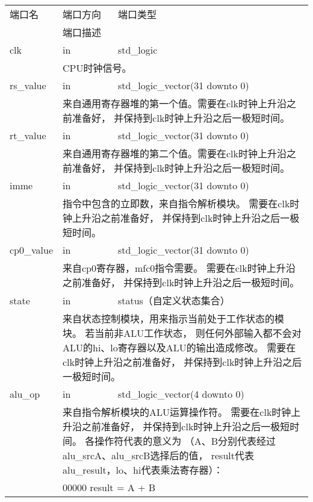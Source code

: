         \begin{tabularx}{\textwidth}{lll}
            \toprule
            端口名          & 端口方向 & 端口类型 \\
            \cmidrule(l){2-3}
                            & \multicolumn{2}{l}{端口描述} \\
            \midrule
            clk             & in       & std\_logic \\
            \cmidrule(l){2-3}
            &
            \multicolumn{2}{X}{CPU时钟信号。} \\
            \midrule
            rs\_value        & in       & std\_logic\_vector(31 downto 0) \\
            \cmidrule(l){2-3}
            &
            \multicolumn{2}{X}{
            来自通用寄存器堆的第一个值。需要在clk时钟上升沿之前准备好，%
            并保持到clk时钟上升沿之后一极短时间。} \\
            \midrule
            rt\_value        & in       & std\_logic\_vector(31 downto 0) \\
            \cmidrule(l){2-3}
            & 
            \multicolumn{2}{X}{
            来自通用寄存器堆的第二个值。需要在clk时钟上升沿之前准备好，%
            并保持到clk时钟上升沿之后一极短时间。} \\
            \midrule
            imme            & in       & std\_logic\_vector(31 downto 0) \\
            \cmidrule(l){2-3}
            &
            \multicolumn{2}{X}{
            指令中包含的立即数，来自指令解析模块。%
            需要在clk时钟上升沿之前准备好，%
            并保持到clk时钟上升沿之后一极短时间。} \\
            \midrule
            cp0\_value      & in       & std\_logic\_vector(31 downto 0) \\
            \cmidrule(l){2-3}
            &
            \multicolumn{2}{X}{
            来自cp0寄存器，mfc0指令需要。%
            需要在clk时钟上升沿之前准备好，%
            并保持到clk时钟上升沿之后一极短时间。} \\
            \midrule
            state           & in       & status（自定义状态集合） \\
            \cmidrule(l){2-3}
            &
            \multicolumn{2}{X}{
            来自状态控制模块，用来指示当前处于工作状态的模块。%
            若当前非ALU工作状态，%
            则任何外部输入都不会对ALU的hi、lo寄存器以及ALU的输出造成修改。%
            需要在clk时钟上升沿之前准备好，%
            并保持到clk时钟上升沿之后一极短时间。} \\
            \midrule
            alu\_op         & in       & std\_logic\_vector(4 downto 0) \\
            \cmidrule(l){2-3}
            &
            \multicolumn{2}{X}{
            来自指令解析模块的ALU运算操作符。%
            需要在clk时钟上升沿之前准备好，%
            并保持到clk时钟上升沿之后一极短时间。%
            各操作符代表的意义为%
            （A、B分别代表经过alu\_srcA、alu\_srcB选择后的值，%
            result代表alu\_result，lo、hi代表乘法寄存器）：%
            } \\
            &
            \multicolumn{2}{X}{
            00000 result = A + B

}
\end{tabularx}
